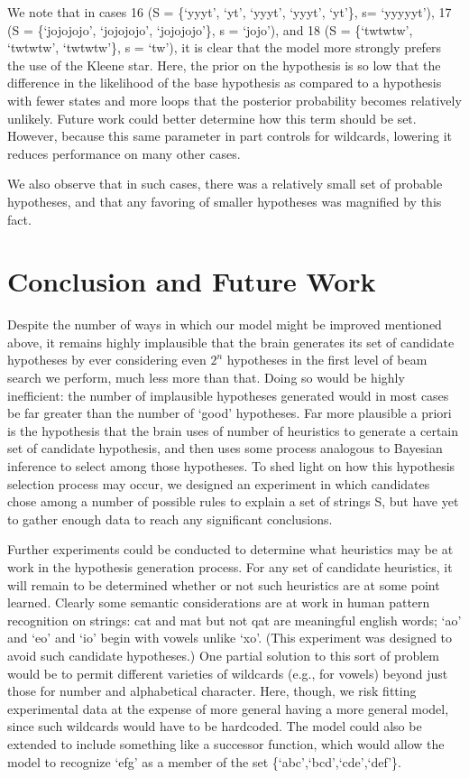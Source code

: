 \documentclass[10pt,letterpaper]{article}
\begin{document}
We note that in cases 16 (S = \{`yyyt', `yt', `yyyt', `yyyt', `yt'\}, s= `yyyyyt'), 17 (S = \{`jojojojo', `jojojojo', `jojojojo'\}, s = `jojo'), and 18 (S = \{`twtwtw', `twtwtw', `twtwtw'\}, s =  `tw'), it is clear that the model more strongly prefers the use of the Kleene star. Here, the prior on the hypothesis is so low that the difference in the likelihood of the base hypothesis as compared to a hypothesis with fewer states and more loops that the posterior probability becomes relatively unlikely. Future work could better determine how this term should be set. However, because this same parameter in part controls for wildcards, lowering it reduces performance on many other cases. 

We also observe that in such cases, there was a relatively small set of probable hypotheses, and that any favoring of smaller hypotheses was magnified by this fact.

\section{Conclusion and Future Work}
Despite the number of ways in which our model might be improved mentioned above,  it remains highly implausible that the brain generates its set of candidate hypotheses by ever considering even $2^n$ hypotheses in the first level of beam search we perform, much less more than that. Doing so would be highly inefficient: the number of implausible hypotheses generated would in most cases be far greater than the number of `good' hypotheses. Far more plausible a priori is the hypothesis that the brain uses of number of heuristics to generate a certain set of candidate hypothesis, and then uses some process analogous to Bayesian inference to select among those hypotheses. To shed light on how this hypothesis selection process may occur, we designed an experiment in which candidates chose among a number of possible rules to explain a set of strings S, but have yet to gather enough data to reach any significant conclusions. 

Further experiments could be conducted to determine what heuristics may be at work in the hypothesis generation process. For any set of candidate heuristics, it will remain to be determined whether or not such heuristics are at some point learned. Clearly some semantic considerations are at work in human pattern recognition on strings: cat and mat but not qat are meaningful english words; `ao' and `eo' and `io' begin with vowels unlike `xo'. (This experiment was designed to avoid such candidate hypotheses.) One partial solution to this sort of problem would be to permit different varieties of wildcards (e.g., for vowels) beyond just those for number and alphabetical character. Here, though, we risk fitting experimental data at the expense of more general having a more general model, since such wildcards would have to be hardcoded. The model could also be extended to include something like a successor function, which would allow the model to recognize `efg' as a member of the set \{`abc',`bcd',`cde',`def'\}.
\end{document}
